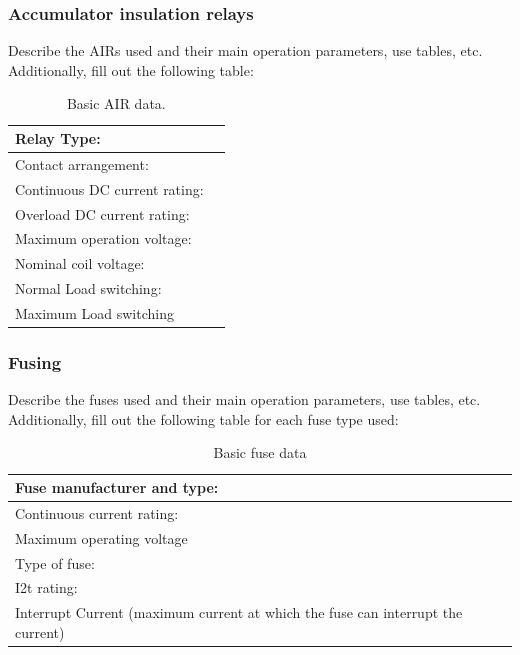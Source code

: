 \subsubsection{Accumulator insulation relays}
Describe the AIRs used and their main operation parameters, use tables, etc.
Additionally, fill out the following table:

\begin{table}[H]
	\centering
	\caption{Basic AIR data.}
	\begin{tabularx}{\textwidth}{|X|X|}
		\hline
		Relay Type: &  \\[\TableSize]
		\hline
		Contact arrangement: &  \\[\TableSize]
		\hline
		Continuous DC current rating: &  \\[\TableSize]
		\hline
		Overload DC current rating:  &  \\[\TableSize]
		\hline
		Maximum operation voltage: &  \\[\TableSize]
		\hline
		Nominal coil voltage: &  \\[\TableSize]
		\hline
		Normal Load switching: & \\[\TableSize]
		\hline
		Maximum Load switching &  \\[\TableSize]
		\hline
	\end{tabularx}%
	\label{tab:acc-air}%
\end{table}%

\subsubsection{Fusing}
Describe the fuses used and their main operation parameters, use tables, etc.
Additionally, fill out the following table for each fuse type used:

\begin{table}[H]
	\centering
	\caption{Basic fuse data}
	\begin{tabularx}{\textwidth}{|X|X|}
		\hline
		Fuse manufacturer and type: &  \\[\TableSize]
		\hline
		Continuous current rating:  &  \\[\TableSize]
		\hline
		Maximum operating voltage  &  \\[\TableSize]
		\hline
		Type of fuse: &  \\[\TableSize]
		\hline
		I2t rating: &  \\[\TableSize]
		\hline
		Interrupt Current (maximum current at which the fuse can interrupt the current) &  \\[\TableSize]
		\hline
	\end{tabularx}%
	\label{tab:acc-fuse}%
\end{table}%

